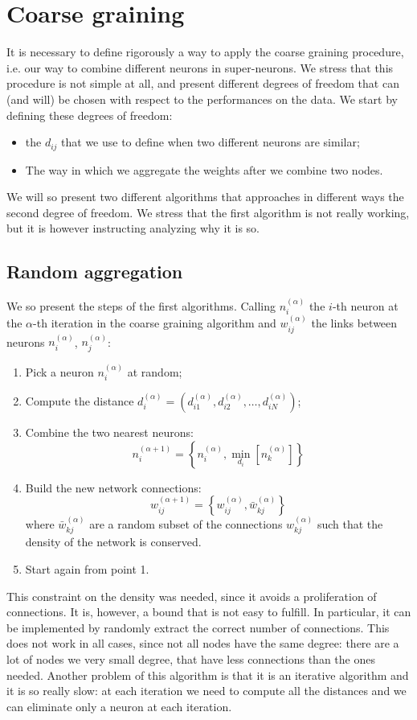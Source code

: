 \section{Coarse graining}
It is necessary to define rigorously a way to apply the 
coarse graining procedure, i.e. our way to combine different
neurons in super-neurons. We stress that this procedure
is not simple at all, and present different degrees of freedom
that can (and will) be chosen with respect to the performances
on the data. We start by defining these degrees of freedom:
\begin{itemize}
    \item the  $d_{ij}$ that we use to define when two 
        different neurons are similar;
    \item The way in which we aggregate the weights after we combine 
        two nodes.
\end{itemize}
We will so present two different algorithms that approaches in different ways the second 
degree of freedom. We stress that the first algorithm is not really working, but it is 
however instructing analyzing why it is so.

\subsection{Random aggregation}
We so present the steps of the first algorithms. Calling $n_i^{(\alpha)}$ the $i$-th 
neuron at the $\alpha$-th iteration in the coarse graining algorithm and $w_{ij}^{(\alpha)}$
the links between neurons $n_i^{(\alpha)}$, $n_j^{(\alpha)}$:
\begin{enumerate}
    \item Pick a neuron $n_i^{(\alpha)}$ at random;
    \item Compute the distance $d_i^{(\alpha)}=(d_{i1}^{(\alpha)}, d_{i2}^{(\alpha)}, \dots, d_{iN}^{(\alpha)})$;
    \item Combine the two nearest neurons:
        $$
        n_i^{(\alpha+1)} = \left\{ n_i^{(\alpha)}, \min_{d_i}\left[n_k^{(\alpha)}\right] \right\}
        $$
    \item Build the new network connections:
        $$
        w_{ij}^{(\alpha+1)} = \left\{ w_{ij}^{(\alpha)}, \bar{w}_{kj}^{(\alpha)}   \right\}
        $$
        where $\bar{w}_{kj}^{(\alpha)}$ are a random subset of the connections $w^{(\alpha)}_{kj}$ such that 
        the density of the network is conserved.
    \item Start again from point 1.
\end{enumerate} 
This constraint on the density was needed, since it avoids a proliferation of connections.
It is, however, a bound that is not easy to fulfill. In particular, it can be implemented 
by randomly extract the correct number of connections. This does not work in all cases, since
not all nodes have the same degree: there are a lot of nodes we very small degree, that have 
less connections than the ones needed. Another problem of this algorithm is that it is an
iterative algorithm and it is so really slow: at each iteration we need to compute all the 
distances and we can eliminate only a neuron at each iteration.

